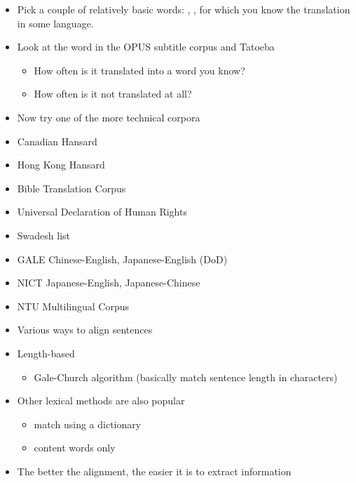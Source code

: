 \documentclass[a4paper,landscape,headrule,footrule,xetex]{foils}
\begin{document}
\begin{itemize}
\item Pick a couple of relatively basic words: , , 
  for which you know the translation in some language.
\item Look at the word in the OPUS subtitle corpus and Tatoeba
  \begin{itemize}
  \item How often is it translated into a word you know?
  \item How often is it not translated at all?
  \end{itemize}
\item Now try one of the more technical corpora

\end{itemize}



\begin{itemize}
\item Canadian Hansard
\item Hong Kong Hansard
\item Bible Translation Corpus
\item Universal Declaration of Human Rights
\item Swadesh list
\item GALE Chinese-English, Japanese-English (DoD)
\item NICT Japanese-English, Japanese-Chinese
\item NTU Multilingual Corpus
\end{itemize}

\begin{itemize}
\item Various ways to align sentences
\item Length-based
  \begin{itemize}
  \item Gale-Church algorithm (basically match sentence length in characters)
  \end{itemize}
\item Other lexical methods are also popular
  \begin{itemize}
  \item match using a dictionary
  \item content words only
  \end{itemize}
\item The better the alignment, the easier it is to extract information
\end{itemize}
\end{document}
